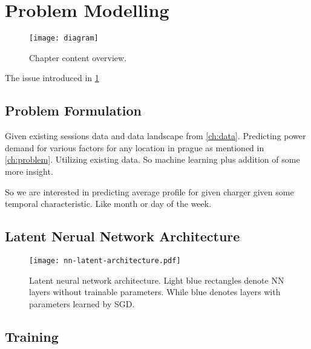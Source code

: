 \chapter{Problem Modelling}
\label{ch:problem}

\begin{figure*}[hb]
    \texttt{[image: diagram]}
    \caption[Problem modelling overview]{Chapter content overview. }
\end{figure*}

The issue introduced in \ref{ch:problem}


\section{Problem Formulation}

Given existing sessions data and data landscape from \autoref{ch:data}. Predicting power demand for various factors for any location in prague as mentioned in \autoref{ch:problem}. Utilizing existing data. So machine learning plus addition of some more insight.

So we are interested in predicting average profile for given charger given some temporal characteristic. Like month or day of the week.


\section{Latent Nerual Network Architecture}


\begin{figure}[hb]
    \texttt{[image: nn-latent-architecture.pdf]}
    \caption[Latent Neural Network Architecture]{Latent neural network architecture. Light blue rectangles denote NN layers without trainable parameters. While blue denotes layers with parameters learned by SGD. }
    \label{fig:nn-latent}
\end{figure}




\section{Training}

